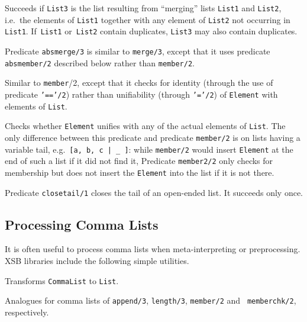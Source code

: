 \begin{description}
    Succeeds if {\tt List3} is the list resulting from ``merging'' lists 
    {\tt List1} and {\tt List2},
    i.e.\ the elements of {\tt List1} together with any element of 
    {\tt List2} not occurring in {\tt List1}.
    If~{\tt List1} or~{\tt List2} contain duplicates, {\tt List3} may 
    also contain duplicates.

    Predicate {\tt absmerge/3} is similar to {\tt merge/3}, except that 
    it uses predicate {\tt absmember/2} described below rather than 
    {\tt member/2}.

    Similar to {\tt member}/2, except that it checks for identity
    (through the use of predicate {\tt '=='/2}) rather than unifiability 
    (through {\tt '='/2}) of {\tt Element} with elements of {\tt List}.

    Checks whether {\tt Element} unifies with any of the actual elements 
    of {\tt List}.  The only difference between this predicate and 
    predicate {\tt member/2} is on lists having a variable tail, 
    e.g.\ \verb'[a, b, c | _ ]': while {\tt member/2} would insert 
    {\tt Element} at the end of such a list if it did not find it, 
    Predicate {\tt member2/2} only checks for membership but does not 
    insert the {\tt Element} into the list if it is not there.

    Predicate {\tt closetail/1} closes the tail of an open-ended list.
    It succeeds only once.

\end{description}

\subsection{Processing Comma Lists}

It is often useful to process comma lists when meta-interpreting or
preprocessing.  XSB libraries include the following simple utilities.

\begin{description}


%
Transforms {\tt CommaList} to {\tt List}.

%

%

%
%
Analogues for comma lists of {\tt append/3}, {\tt length/3}, {\tt member/2} and {\tt
memberchk/2}, respectively.

\end{description}
	
